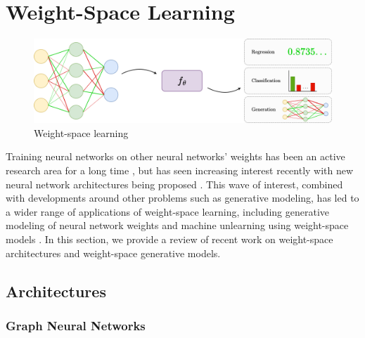 
\chapter{Weight-Space Learning}\label{section:wsl}

\begin{figure}[h!]
    \centering
    \includegraphics[width=0.8\linewidth]{figures/wsl.drawio.png}
    \caption{\label{fig:wsl} Weight-space learning}    
\end{figure}

Training neural networks on other neural networks' weights has been an active research area for a long time \citep{haHyperNetworks2016, kruegerBayesianHypernetworks2018}, but has seen increasing interest recently with new neural network architectures being proposed \citep{limGraphMetanetworksProcessing2023,kofinasGraphNeuralNetworks2024,
zhouNeuralFunctionalTransformers2023,zhouUniversalNeuralFunctionals2024}. This wave of interest, combined with developments around other problems such as generative modeling, has led to a wider range of applications of weight-space learning, including generative modeling of neural network weights \citep{peeblesLearningLearnGenerative2022, erkocHyperDiffusionGeneratingImplicit2023} and machine unlearning using weight-space models \citep{rangelLearningForgetUsing2024}. In this section, we provide a review of recent work on weight-space architectures and weight-space generative models. 

\section{Architectures}



\subsection{Graph Neural Networks}

